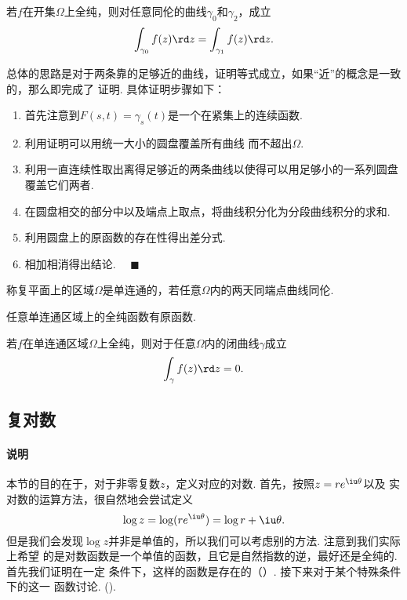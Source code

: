   \begin{thm}
    若$f$在开集$\Omega$上全纯，则对任意同伦的曲线$\gamma_0$和$\gamma_2$，成立
    \[
      \int_{\gamma_0}f(z)\rd z = \int_{\gamma_1}f(z)\rd z.
    \]
  \end{thm}
  \proof
    总体的思路是对于两条靠的足够近的曲线，证明等式成立，如果“近”的概念是一致的，那么即完成了
    证明. 具体证明步骤如下：
    \begin{enumerate}
      \item 首先注意到$F(s, t)=\gamma_s(t)$是一个在紧集上的连续函数.
      \item 利用证明可以用统一大小的圆盘覆盖所有曲线
        而不超出$\Omega$.
      \item 利用一直连续性取出离得足够近的两条曲线以使得可以用足够小的一系列圆盘覆盖它们两者.
      \item 在圆盘相交的部分中以及端点上取点，将曲线积分化为分段曲线积分的求和.
      \item 利用圆盘上的原函数的存在性得出差分式.
      \item 相加相消得出结论. $\quad\blacksquare$
    \end{enumerate}

  \begin{defi}[单连通]
    称复平面上的区域$\Omega$是单连通的，若任意$\Omega$内的两天同端点曲线同伦.
  \end{defi}

  \begin{thm}
    任意单连通区域上的全纯函数有原函数.
  \end{thm}

  \begin{thm}[Cauchy]
    若$f$在单连通区域$\Omega$上全纯，则对于任意$\Omega$内的闭曲线$\gamma$成立
    \[
      \int_\gamma f(z)\rd z = 0.
    \]
  \end{thm}


\subsection{复对数}
  \paragraph{说明}
    本节的目的在于，对于非零复数$z$，定义对应的对数. 首先，按照$z=re^{\iu\theta}$以及
    实对数的运算方法，很自然地会尝试定义
    \begin{equation}
      \label{equ: 复对数}
      \log z = \log(re^{\iu\theta}) = \log r + \iu\theta.
    \end{equation}
    但是我们会发现$\log z$并非是单值的，所以我们可以考虑别的方法. 注意到我们实际上希望
    的是对数函数是一个单值的函数，且它是自然指数的逆，最好还是全纯的. 首先我们证明在一定
    条件下，这样的函数是存在的（）. 接下来对于某个特殊条件下的这一
    函数讨论. ().


